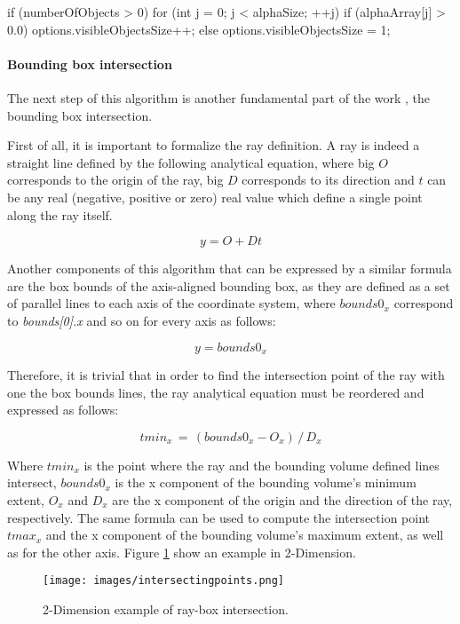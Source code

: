 \documentclass[12pt,a4paper]{extarticle}
\begin{document}
\begin{cpp}[caption={Computation of the number of visible objects concerning the defined elements of the alphaArray with opacity greater than zero},label=code:visibleObjSize]
if (numberOfObjects > 0) {
	for (int j = 0; j < alphaSize; ++j) {
		if (alphaArray[j] > 0.0) {
			options.visibleObjectsSize++;
		}
	}
} else {
	options.visibleObjectsSize = 1;
}
\end{cpp}

\paragraph{Bounding box intersection} The next step of this algorithm is another fundamental part of the work \cite{levoy_1990:5}, the bounding box intersection.

First of all, it is important to formalize the ray definition. A ray is indeed a straight line defined by the following analytical equation, where big $O$ corresponds to the origin of the ray, big $D$ corresponds to its direction and $t$ can be any real (negative, positive or zero) real value which define a single point along the ray itself.

\[
y = O +Dt
\]

Another components of this algorithm that can be expressed by a similar formula are the box bounds of the axis-aligned bounding box,  as they are defined as a set of parallel lines to each axis of the coordinate system, where $bounds0_{x}$ correspond to \textit{bounds[0].x} and so on for every axis as follows:

\[
y = bounds0_{x}
\] 

Therefore, it is trivial that in order to find the intersection point of the ray with one the box bounds lines, the ray analytical equation must be reordered and expressed as follows:

\[
tmin_{x}\,=\,(bounds0_{x} - O_{x})\,/\,D_{x}
\] 

Where $tmin_{x}$ is the point where the ray and the bounding volume defined lines intersect, $bounds0_{x}$ is the x component of the bounding volume's minimum extent, $O_{x}$ and $D_{x}$ are the x component of the origin and the direction of the ray, respectively. The same formula can be used to compute the intersection point $tmax_{x}$ and the x component of the bounding volume's maximum extent, as well as for the other axis. Figure \ref{fig:intersectingpoints} show an example in 2-Dimension.

\begin{figure}[hbtp]
\centering
\texttt{[image: images/intersectingpoints.png]}
\caption{2-Dimension example of ray-box intersection.}
\label{fig:intersectingpoints}
\end{figure}
\end{document}
